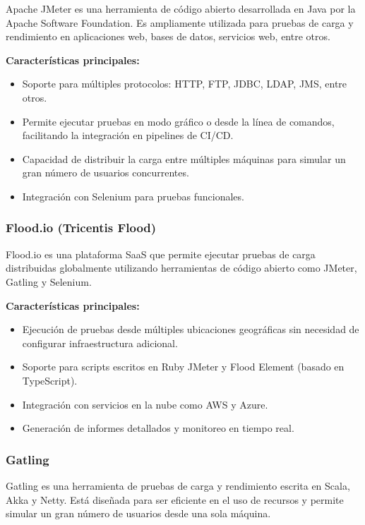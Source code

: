 Apache JMeter es una herramienta de código abierto desarrollada en Java por la Apache Software Foundation. Es ampliamente utilizada para pruebas de carga y rendimiento en aplicaciones web, bases de datos, servicios web, entre otros.

\textbf{Características principales:}
\begin{itemize}
    \item Soporte para múltiples protocolos: HTTP, FTP, JDBC, LDAP, JMS, entre otros.
    \item Permite ejecutar pruebas en modo gráfico o desde la línea de comandos, facilitando la integración en pipelines de CI/CD.
    \item Capacidad de distribuir la carga entre múltiples máquinas para simular un gran número de usuarios concurrentes.
    \item Integración con Selenium para pruebas funcionales.
\end{itemize}

\subsubsection{Flood.io (Tricentis Flood)}

Flood.io es una plataforma SaaS que permite ejecutar pruebas de carga distribuidas globalmente utilizando herramientas de código abierto como JMeter, Gatling y Selenium.

\textbf{Características principales:}
\begin{itemize}
    \item Ejecución de pruebas desde múltiples ubicaciones geográficas sin necesidad de configurar infraestructura adicional.
    \item Soporte para scripts escritos en Ruby JMeter y Flood Element (basado en TypeScript).
    \item Integración con servicios en la nube como AWS y Azure.
    \item Generación de informes detallados y monitoreo en tiempo real.
\end{itemize}

\subsubsection{Gatling}

Gatling es una herramienta de pruebas de carga y rendimiento escrita en Scala, Akka y Netty. Está diseñada para ser eficiente en el uso de recursos y permite simular un gran número de usuarios desde una sola máquina.

